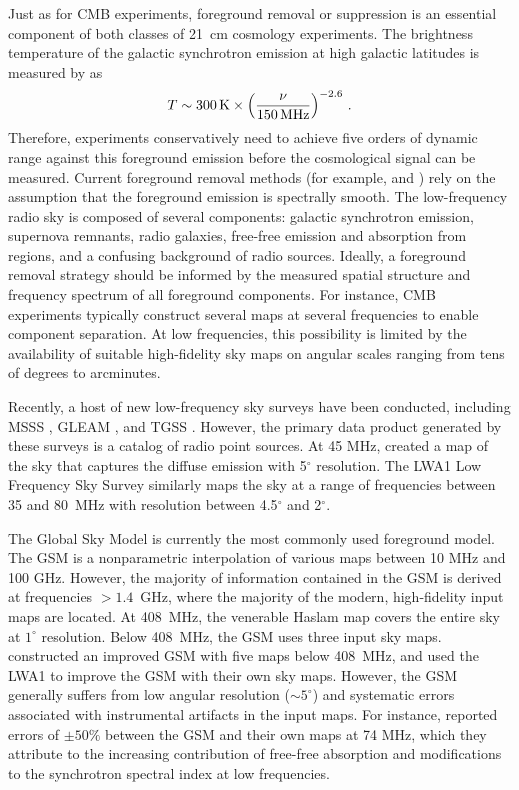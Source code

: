 \documentclass[twocolumn]{aastex61}
\begin{document}
Just as for CMB experiments, foreground removal or suppression is an essential component of both
classes of 21~cm cosmology experiments. The brightness temperature of the galactic synchrotron
emission at high galactic latitudes is measured by \citet{2017MNRAS.464.4995M} as
\begin{equation}
    T \sim 300\,{\rm K} \times \left(\frac{\nu}{150\,{\rm MHz}}\right)^{-2.6}\,.
\end{equation}
Therefore, experiments conservatively need to achieve five orders of dynamic range against this
foreground emission before the cosmological signal can be measured. Current foreground removal
methods (for example, \citealt{2012ApJ...756..165P} and \citealt{2013MNRAS.429..165C}) rely on the
assumption that the foreground emission is spectrally smooth. The low-frequency radio sky is
composed of several components: galactic synchrotron emission, supernova remnants, radio galaxies,
free-free emission and absorption from  regions, and a confusing background of radio
sources.  Ideally, a foreground removal strategy should be informed by the measured spatial
structure and frequency spectrum of all foreground components. For instance, CMB experiments
typically construct several maps at several frequencies to enable component separation.  At low
frequencies, this possibility is limited by the availability of suitable high-fidelity sky maps on
angular scales ranging from tens of degrees to arcminutes.

Recently, a host of new low-frequency sky surveys have been conducted, including MSSS
\citep{2015A&A...582A.123H}, GLEAM \citep{2015PASA...32...25W}, and TGSS
\citep{2017A&A...598A..78I}. However, the primary data product generated by these surveys is a
catalog of radio point sources. At 45 MHz, \citet{2011A&A...525A.138G} created a map of the sky that
captures the diffuse emission with 5$^\circ$ resolution.  The LWA1 Low Frequency Sky Survey
\citep[LLFSS;][]{2017MNRAS.469.4537D} similarly maps the sky at a range of frequencies between
35 and 80~MHz with resolution between 4.5$^\circ$ and 2$^\circ$.

The Global Sky Model \citep[GSM;][]{2008MNRAS.388..247D} is currently the most commonly used
foreground model. The GSM is a nonparametric interpolation of various maps between 10 MHz and 100
GHz. However, the majority of information contained in the GSM is derived at frequencies $>1.4$~GHz,
where the majority of the modern, high-fidelity input maps are located. At 408~MHz, the venerable
Haslam map \citep{1981A&A...100..209H, 1982A&AS...47....1H} covers the entire sky at $1^\circ$
resolution.  Below 408~MHz, the GSM uses three input sky maps. \citet{2017MNRAS.464.3486Z}
constructed an improved GSM with five maps below 408~MHz, and \citet{2017MNRAS.469.4537D} used the
LWA1 to improve the GSM with their own sky maps.  However, the GSM generally suffers from low
angular resolution ($\sim 5^\circ$) and systematic errors associated with instrumental artifacts in
the input maps.  For instance, \citet{2017MNRAS.469.4537D} reported errors of $\pm 50\%$ between the
GSM and their own maps at 74 MHz, which they attribute to the increasing contribution of free-free
absorption and modifications to the synchrotron spectral index at low frequencies.
\end{document}
